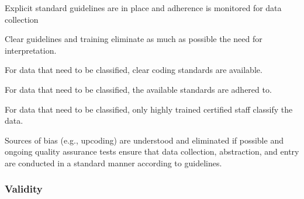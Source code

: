 \begin{QandA}
    \item Explicit standard guidelines are in place and adherence is monitored for data collection
    \begin{answered}
        
    \end{answered}

    \item Clear guidelines and training eliminate as much as possible the need for interpretation.
    \begin{answered}
        
    \end{answered}

    \item For data that need to be classified, clear coding standards are available.
    \begin{answered}
        
    \end{answered}

    \item For data that need to be classified, the available standards are adhered to.
    \begin{answered}
        
    \end{answered}

    \item For data that need to be classified, only highly trained certified staff classify the data.
    \begin{answered}
        
    \end{answered}

    \item Sources of bias (e.g., upcoding) are understood and eliminated if possible and ongoing quality assurance tests ensure that data collection, abstraction, and entry are conducted in a standard manner according to guidelines.
    \begin{answered}
        
    \end{answered}

\end{QandA}

\subsubsection{Validity}

